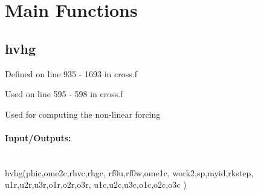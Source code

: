 \documentclass[titlepage,12pt,letter]{article}
\numberwithin{equation}{section}
\begin{document}
\newpage
\section{Main Functions}
\subsection{hvhg}
Defined on line 935 - 1693 in cross.f

Used on line 595 - 598 in cross.f

Used for computing the non-linear forcing 

\paragraph{Input/Outputs:}\phantom{a}\\
hvhg(phic,ome2c,rhvc,rhgc, rf0u,rf0w,ome1c, work2,sp,myid,rkstep, \\\phantom{hvhg} u1r,u2r,u3r,o1r,o2r,o3r, u1c,u2c,u3c,o1c,o2c,o3c )
\end{document}
